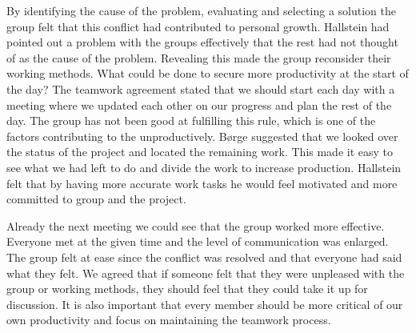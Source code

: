 By identifying the cause of the problem, evaluating and selecting a solution the group felt that this conflict had contributed to personal growth. Hallstein had pointed out a problem with the groups effectively that the rest had not thought of as the cause of the problem. Revealing this made the group reconsider their working methods. What could be done to secure more productivity at the start of the day? The teamwork agreement stated that we should start each day with a meeting where we updated each other on our progress and plan the rest of the day. The group has not been good at fulfilling this rule, which is one of the factors contributing to the unproductively. Børge suggested that we looked over the status of the project and located the remaining work. This made it easy to see what we had left to do and divide the work to increase production. Hallstein felt that by having more accurate work tasks he would feel motivated and more committed to group and the project.  

Already the next meeting we could see that the group worked more effective. Everyone met at the given time and the level of communication was enlarged. The group felt at ease since the conflict was resolved and that everyone had said what they felt. We agreed that if someone felt that they were unpleased with the group or working methods, they should feel that they could take it up  for discussion.  It is also important that every member should be more critical of our own productivity and focus on maintaining the teamwork process.  
